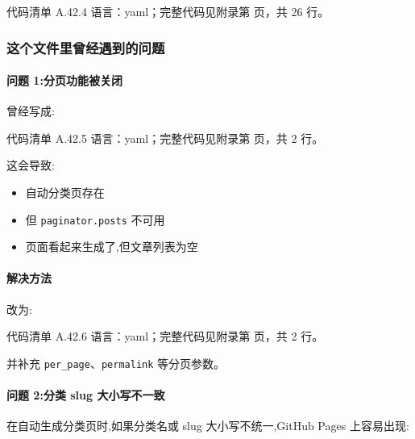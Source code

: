 \documentclass[lang=cn,scheme=chinese,color=blue,device=normal,toc=onecol,math=cm]{elegantbook}
\begin{document}
\begin{codeindexbox}{代码清单 A.42.4}
语言：yaml；完整代码见附录第 \pageref{code:42:4} 页，共 26 行。
\end{codeindexbox}


\subsubsection{这个文件里曾经遇到的问题}


\paragraph{问题 1:分页功能被关闭}


曾经写成:\par


\begin{codeindexbox}{代码清单 A.42.5}
语言：yaml；完整代码见附录第 \pageref{code:42:5} 页，共 2 行。
\end{codeindexbox}


这会导致:\par


\begin{itemize}
\item 自动分类页存在
\item 但 \texttt{paginator.posts} 不可用
\item 页面看起来生成了,但文章列表为空
\end{itemize}


\paragraph{解决方法}


改为:\par


\begin{codeindexbox}{代码清单 A.42.6}
语言：yaml；完整代码见附录第 \pageref{code:42:6} 页，共 2 行。
\end{codeindexbox}


并补充 \texttt{per\_\allowbreak{}page}、\texttt{permalink} 等分页参数。\par


\paragraph{问题 2:分类 slug 大小写不一致}


在自动生成分类页时,如果分类名或 slug 大小写不统一,GitHub Pages 上容易出现:\par
\end{document}
